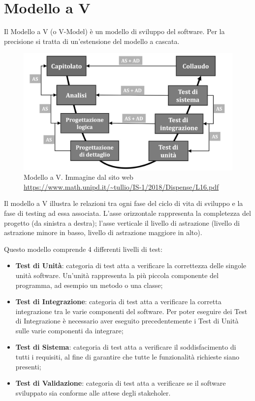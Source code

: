 \section{Modello a V}
\label{modelloV}

Il Modello a V (o V-Model) è un modello di sviluppo del software. Per la precisione si tratta di un'estensione del modello a cascata. 

\begin{figure}[H]
\centering
	\includegraphics[width=0.7\linewidth]{./images/modellov.jpg} 
	\caption{Modello a V. Immagine dal sito web \url{https://www.math.unipd.it/~tullio/IS-1/2018/Dispense/L16.pdf}}
	\label{vmodel}
\end{figure}

Il modello a V illustra le relazioni tra ogni fase del ciclo di vita di sviluppo e la fase di testing ad essa associata. L'asse orizzontale rappresenta la completezza del progetto (da sinistra a destra); l'asse verticale il livello di astrazione (livello di astrazione minore in basso, livello di astrazione maggiore in alto).

Questo modello comprende 4 differenti livelli di test: 
\begin{itemize}
	\item \textbf{Test di Unità}: categoria di test atta a verificare la correttezza delle singole unità software. Un'unità rappresenta la più piccola componente del programma, ad esempio un metodo o una classe;
	\item \textbf{Test di Integrazione}: categoria di test atta a verificare la corretta integrazione tra le varie componenti del software. Per poter eseguire dei Test di Integrazione è necessario aver eseguito precedentemente i Test di Unità sulle varie componenti da integrare;
	\item \textbf{Test di Sistema}: categoria di test atta a verificare il soddisfacimento di tutti i requisiti, al fine di garantire che tutte le funzionalità richieste siano presenti;
	\item \textbf{Test di Validazione}: categoria di test atta a verificare se il software sviluppato sia conforme alle attese degli stakeholer.
\end{itemize}

